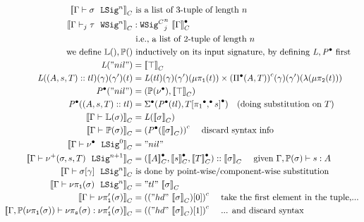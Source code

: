 \begin{align*}
  \denotesC{\goodSig{\Gm}{\lsig}{n}} & \text{ is a list of 3-tuple of length $n$  } \\
  \denotesC{\goodWSigU{j}{\Gm}{\wsig}{n}} &: \GMWSig{j}{\denotesCC{\Gm}}{n} \\ 
    &\text{ i.e., a list of 2-tuple of length $n$ } \\
  \text{we define }\TyLkg{}, \TyTkg{} & \text{ inductively on its input signature, by defining } \mathit{L},\Glued{\mathit{P}} \text{ first}  \\ 
  \mathit{L}("nil") &=  \denotesC{\top}  \\
  \mathit{L}((A,s,T) :: tl)(\gm)(\gm')(t) &= {\mathit{L}(tl)}(\gm)(\gm')(\lkgproj{1}{t}) \times \Gmodel{\GluedPi{A}{T}}(\gm)(\gm')(\lam{\lkgproj{2}{t}})   \\
  \Glued{\mathit{P}}("nil") &= ( \TyTkg{\LSigEmp} , \denotesC{\top} )\\
  \Glued{\mathit{P}}((A,s,T) :: tl) &= \Glued{\Sigma}(\Glued{\mathit{P}}(tl), \Gsub{T}{\GSubstExt{\Glued{\pi_1}}{s}}) \quad \text{(doing substitution on $T$)} \\
  \denotesC{\goodType{\Gm}{\TyLkg{\lsig}}{}} &= {\mathit{L}(\denotesC{\lsig})} \\
  \denotesC{\goodType{\Gm}{\TyTkg{\lsig}}{}} &= \Gmodel{\Glued{\mathit{P}}(\denotesC{\lsig})} \quad \text{ discard syntax info}  \\
  \denotesC{\goodSig{\Gm}{\LSigEmp}{0}} &= "nil"\\ 
  \denotesC{\goodSig{\Gm}{\LSigAdd{\lsig}{s}{T}}{n+1}} &= (\denotesCC{A}, \denotesCC{s}, \denotesCC{T})::\denotesC{\lsig} \quad \text{ given } \goodTerm{\Gm, \TyTkg{\lsig}}{s}{A} \\ 
  \denotesC{\goodSig{\Gm}{\sub{\lsig}{\gm}}{n}} & \text{ is done by point-wise/component-wise substitution} \\
  \denotesC{\goodSig{\Gm}{\lsigproj{1}{\lsig}}{n}} &= "tl"~\denotesC{\lsig}\\ 
  \denotesC{\goodType{\Gm}{\lsigprojT{\lsig}}{}} &= \Gmodel{("hd"~\denotesC{\lsig})[0]} \quad \text{ take the first element in the tuple,...}\\ 
  \denotesC{\goodTerm{\Gm, \TyTkg{\lsigproj{1}{\lsig}}}{\lsigproj{s}{\lsig}}{\lsigprojT{\lsig}}} &= \Gmodel{("hd"~\denotesC{\lsig})[1]} \quad \text{  ... and discard syntax}\\ 

\end{align*}
